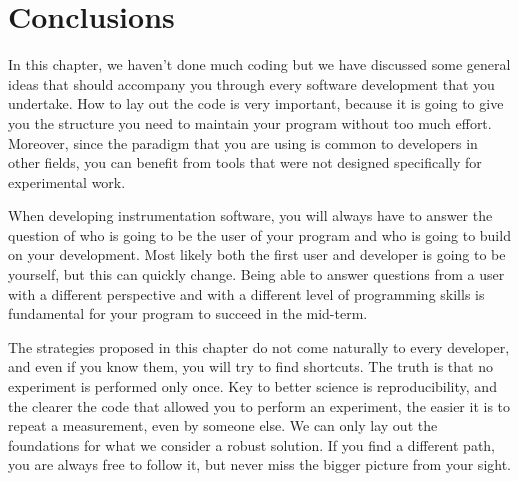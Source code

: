 
\section{Conclusions}\label{section:layout-conclusions}
In this chapter, we haven't done much coding but we have discussed some general ideas that should accompany you through every software
development that you undertake. How to lay out the code is very important, because it is going to give you the structure you need to
maintain your program without too much effort. Moreover, since the paradigm that you are using is common to developers in other fields, you can benefit from tools that were not designed specifically for experimental work.

When developing instrumentation software, you will always have to answer the question of who is going to be the user of your program and who is going to build on your development. Most likely both the first user and developer is going to be yourself, but this can quickly change. Being able to answer questions from a user with a different perspective and with a different level of programming skills is fundamental for your program to succeed in the mid-term.

The strategies proposed in this chapter do not come naturally to every developer, and even if you know them, you will try to find shortcuts. The truth is that no experiment is performed only once. Key to better science is reproducibility, and the clearer the code
that allowed you to perform an experiment, the easier it is to repeat a measurement, even by someone else. We can only lay out the foundations for what we consider a robust solution. If you find a different path, you are always free to follow it, but never miss the bigger picture from your sight. 
